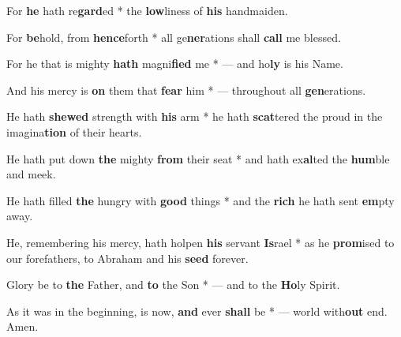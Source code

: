 \begin{multicols}{2}
	For \textbf{he} hath re\textbf{gard}ed * the \textbf{low}liness of \textbf{his} handmaiden.
	
	For \textbf{be}hold, from \textbf{hence}forth * all ge\textbf{ner}ations shall \textbf{call} me blessed.
	
	For he that is mighty \textbf{hath} magni\textbf{fied} me * --- and ho\textbf{ly} is his Name.
	
	And his mercy is \textbf{on} them that \textbf{fear} him * --- throughout all \textbf{gen}erations.
	
	He hath \textbf{shewed} strength with \textbf{his} arm * he hath \textbf{scat}tered the proud in the imagina\textbf{tion} of their hearts.
	
	He hath put down \textbf{the} mighty \textbf{from} their seat * and hath ex\textbf{al}ted the \textbf{hum}ble and meek.
	
	He hath filled \textbf{the} hungry with \textbf{good} things * and the \textbf{rich} he hath sent \textbf{em}pty away.
	
	He, remembering his mercy, hath holpen \textbf{his} servant \textbf{Is}rael * as he \textbf{prom}ised to our forefathers, to Abraham and his \textbf{seed} forever.
	
	Glory be to \textbf{the} Father, and \textbf{to} the Son * --- and to the \textbf{Ho}ly Spirit.
	
	As it was in the beginning, is now, \textbf{and} ever \textbf{shall} be * --- world with\textbf{out} end. Amen.
\end{multicols}